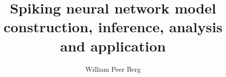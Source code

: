 \documentclass[mphil,deptreport,ai]{infthesis} %
\begin{document}
\begin{preliminary}

\title{Spiking neural network model construction, inference, analysis and application}

\author{William Peer Berg}

\abstract{

}
\end{preliminary}
\end{document}
